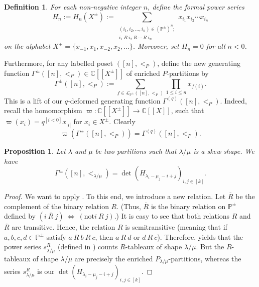 \documentclass[revision]{FPSAC2024}
\newtheorem{defn}{Definition}
\newtheorem{proposition}{Proposition}
\newcommand{\la}{\lambda}
\newcommand{\CC}{\mathbb{C}} %
\newcommand{\PP}{\mathbb{P}} %
\begin{document}
\begin{defn}
For each non-negative integer $n$, define the formal power series
\[
H_n :=
H_{n}(X^\pm)
:=\sum_{\substack{\left(  i_{1},i_{2},\ldots,i_{n}\right)  \in\left(
\mathbb{P}^{\pm}\right)  ^{n};\\i_{1}\ R\ i_{2}\ R\ \cdots\ R\ i_{n}}}
x_{i_{1}}x_{i_{2}}\cdots x_{i_{n}}
\]
on the alphabet $X^\pm = \{x_{-1}, x_1, x_{-2}, x_2, \dots \}$.
Moreover, set $H_{n}=0$ for all $n<0$.
\end{defn}
Furthermore, for any labelled poset $([n], <_P)$, define
the new generating function
$\Gamma^{\pm}\left([n], <_P\right) \in \CC \left[\left[ X^\pm \right]\right]$
of enriched $P$-partitions by
\begin{equation*}
\Gamma^{\pm}([n], <_P) := \sum_{f\in\mathcal{L}_{\PP^\pm}([n],<_{P})} \prod_{1\leq i\leq n}x_{f(i)}.
\end{equation*}
This is a lift of our $q$-deformed generating function
$\Gamma^{(q)}([n], <_P)$.
Indeed, recall the homomorphism $\varpi : \CC \left[\left[X^\pm\right]\right] \longrightarrow \CC\left[\left[X\right]\right]$, such that $\varpi(x_i)=q^{[i<0]}x_{|i|}$ for $x_i \in X^\pm$. Clearly $$\varpi(\Gamma^{\pm}([n], <_P)) = \Gamma^{(q)}([n], <_P).$$
\begin{proposition}
Let $\la$ and $\mu$ be two partitions such that $\la/\mu$ is a skew shape. We have
\begin{equation}
\Gamma^{\pm}([n], <_{\la/\mu})
=\det\left(  H_{\lambda_{i}-\mu_{j}-i+j}\right)  _{i,j\in\left[  k\right]  }.
\label{eq.thm.Ylamu-enum.1}
\end{equation}
\end{proposition}
\begin{proof}
We want to apply \cite[\S 7]{GesVie89}. To this end, we
introduce a new relation. Let $\overline{R}$ be the complement of the binary relation $R$. (Thus,
$\overline{R}$ is the binary relation on $\mathbb{P}^{\pm}$ defined by
$\left(  i\ \overline{R}\ j\right)  \ \Longleftrightarrow\ \left(  \text{not
}i\ R\ j\right)  $.) It is easy to see that both relations $R$ and
$\overline{R}$ are transitive. Hence, the relation $R$ is semitransitive
(meaning that if $a,b,c,d\in\mathbb{P}^{\pm}$ satisfy $a\ R\ b\ R\ c$, then $a\ R\ d$ or $d\ R\ c$). Therefore, \cite[Theorem 11]{GesVie89} yields that the power series $s_{\lambda/\mu}^{R}$ (defined in \cite[\S 7]{GesVie89}) counts $R$-tableaux of shape $\lambda/\mu$. But the $R$-tableaux of shape $\lambda/\mu$ are precisely the enriched $P_{\la/\mu}$-partitions,
whereas the series $s_{\lambda/\mu}^R$ is our $\det\left(  H_{\lambda_{i}-\mu_{j}-i+j}\right)  _{i,j\in\left[  k\right]  }$.
\end{proof}
\end{document}
